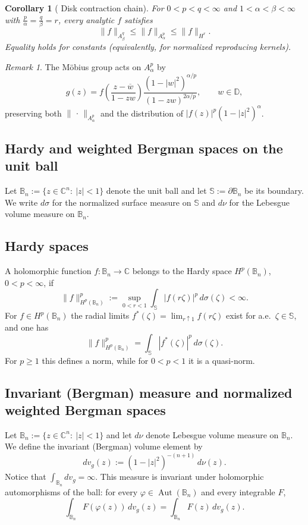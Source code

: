 \documentclass[11pt]{amsart}
\theoremstyle{plain}
\newtheorem{corollary}[theorem]{Corollary}
\theoremstyle{definition}
\theoremstyle{remark}
\newtheorem{remark}[theorem]{Remark}
\newcommand{\D}{\mathbb{D}}
\newcommand{\B}{\mathbb{B}}
\newcommand{\Sph}{\mathbb{S}}
\newcommand{\C}{\mathbb{C}}
\DeclareMathOperator{\Aut}{Aut}
\newcommand{\Ap}[2]{A^{#1}_{#2}}
\newcommand{\Hp}[1]{H^{#1}}
\begin{document}
\begin{corollary}[\cite{KulikovGAFA2022} Disk contraction chain]\label{cor:chain}
For $0<p<q<\infty$ and $1<\alpha<\beta<\infty$ with $\frac{p}{\alpha}=\frac{q}{\beta}=r$, every analytic $f$ satisfies
\[
\|f\|_{\Ap{q}{\beta}} \le \|f\|_{\Ap{p}{\alpha}} \le \|f\|_{\Hp{r}}.
\]
Equality holds for constants (equivalently, for normalized reproducing kernels).
\end{corollary}

\begin{remark}
The M\"obius group acts on $\Ap{p}{\alpha}$ by
\[
g(z)=f\!\left(\frac{z-\overline{ w}}{1-zw}\right)\frac{(1-|w|^2)^{\alpha/p}}{(1-zw)^{2\alpha/p}},\qquad w\in\D,
\]
preserving both $\|\,\cdot\,\|_{\Ap{p}{\alpha}}$ and the distribution of $|f(z)|^p(1-|z|^2)^\alpha$.
\end{remark}


\subsection{Hardy and weighted Bergman spaces on the unit ball}

Let $\B_n:=\{z\in\C^n:\ |z|<1\}$ denote the unit ball and let $\Sph:=\partial\B_n$
be its boundary. We write $d\sigma$ for the normalized surface measure on
$\Sph$ and $d\nu$ for the Lebesgue volume measure on $\B_n$.

\subsection{Hardy spaces}
A holomorphic function $f:\B_n\to\C$ belongs to the Hardy space $H^p(\B_n)$,
$0<p<\infty$, if
\begin{equation*}\label{eq:Hp_def}
\|f\|_{H^p(\B_n)}^p
:=
\sup_{0<r<1}\int_{\Sph} |f(r\zeta)|^p\,d\sigma(\zeta)
<\infty.
\end{equation*}
For $f\in H^p(\B_n)$ the radial limits $f^*(\zeta)=\lim_{r\uparrow1}f(r\zeta)$
exist for a.e.\ $\zeta\in\Sph$, and one has
\[
\|f\|_{H^p(\B_n)}^p=\int_{\Sph}|f^*(\zeta)|^p\,d\sigma(\zeta).
\]
For $p\ge 1$ this defines a norm, while for $0<p<1$ it is a quasi-norm.

\subsection{Invariant (Bergman) measure and normalized weighted Bergman spaces}
Let $\B_n:=\{z\in\C^n:\ |z|<1\}$ and let $d\nu$ denote Lebesgue volume measure on
$\B_n$. We define the invariant (Bergman) volume element by
\begin{equation*}\label{eq:bergman_measure}
dv_g(z):=(1-|z|^2)^{-(n+1)}\,d\nu(z).
\end{equation*}
Notice that
$\int_{\B_n}dv_g=\infty$. This measure is invariant under holomorphic automorphisms
of the ball: for every $\varphi\in\Aut(\B_n)$ and every integrable $F$,
\begin{equation*}\label{eq:bergman_invariance}
\int_{\B_n} F(\varphi(z))\,dv_g(z)=\int_{\B_n} F(z)\,dv_g(z).
\end{equation*}
\end{document}
